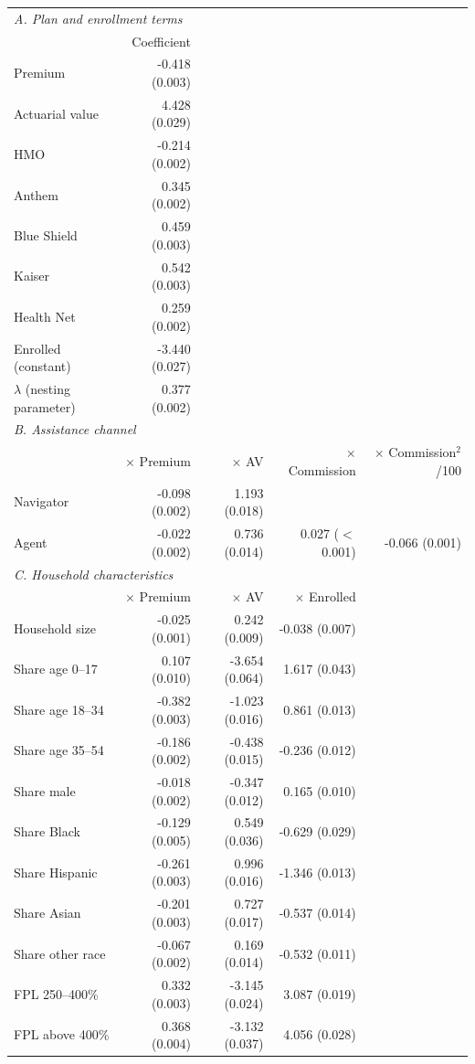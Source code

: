 \begin{tabular}{lrrrr}
\hline\hline
\multicolumn{5}{l}{\emph{A. Plan and enrollment terms}} \\
 & Coefficient & & & \\
\hline
Premium & -0.418 (0.003) & & & \\
Actuarial value & 4.428 (0.029) & & & \\
HMO & -0.214 (0.002) & & & \\
Anthem & 0.345 (0.002) & & & \\
Blue Shield & 0.459 (0.003) & & & \\
Kaiser & 0.542 (0.003) & & & \\
Health Net & 0.259 (0.002) & & & \\
Enrolled (constant) & -3.440 (0.027) & & & \\
$\lambda$ (nesting parameter) & 0.377 (0.002) & & & \\
\hline
\multicolumn{5}{l}{\emph{B. Assistance channel}} \\
 & $\times$ Premium & $\times$ AV & $\times$ Commission & $\times$ Commission$^2$/100 \\
\hline
Navigator & -0.098 (0.002) & 1.193 (0.018) & & \\
Agent & -0.022 (0.002) & 0.736 (0.014) & 0.027 ($<$0.001) & -0.066 (0.001) \\
\hline
\multicolumn{5}{l}{\emph{C. Household characteristics}} \\
 & $\times$ Premium & $\times$ AV & $\times$ Enrolled & \\
\hline
Household size & -0.025 (0.001) & 0.242 (0.009) & -0.038 (0.007) & \\
Share age 0--17 & 0.107 (0.010) & -3.654 (0.064) & 1.617 (0.043) & \\
Share age 18--34 & -0.382 (0.003) & -1.023 (0.016) & 0.861 (0.013) & \\
Share age 35--54 & -0.186 (0.002) & -0.438 (0.015) & -0.236 (0.012) & \\
Share male & -0.018 (0.002) & -0.347 (0.012) & 0.165 (0.010) & \\
Share Black & -0.129 (0.005) & 0.549 (0.036) & -0.629 (0.029) & \\
Share Hispanic & -0.261 (0.003) & 0.996 (0.016) & -1.346 (0.013) & \\
Share Asian & -0.201 (0.003) & 0.727 (0.017) & -0.537 (0.014) & \\
Share other race & -0.067 (0.002) & 0.169 (0.014) & -0.532 (0.011) & \\
FPL 250--400\% & 0.332 (0.003) & -3.145 (0.024) & 3.087 (0.019) & \\
FPL above 400\% & 0.368 (0.004) & -3.132 (0.037) & 4.056 (0.028) & \\
\hline\hline
\end{tabular}
